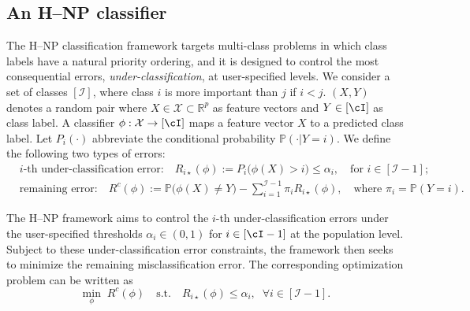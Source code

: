 \subsection{An H--NP classifier}
The H--NP classification framework targets multi-class problems in which class labels have a natural priority ordering, and it is designed to control the most consequential errors, \emph{under-classification}, at user-specified levels. We consider a set of classes $[\mathcal{I}]$, where class $i$ is more important than $j$ if $i < j$. $(X, Y)$ denotes a random pair where $X \in \mathcal{X}\subset \mathbb{R}^p$ as feature vectors and $Y \in [\cI]$ as class label. A classifier $\phi: \mathcal{X}  \rightarrow [\cI]$ maps a feature vector $X$ to a predicted class label. Let  $P_i(\cdot)$ abbreviate the conditional probability $\mathbb{P}(\cdot|Y=i)$.  We define the following two types of errors:
\begin{align}
&\text{$i$-th under-classification error:} \quad R_{i\star}(\phi):= P_i\bigl(\phi(X) > i\bigr)\le \alpha_i, \quad \text{for } i  \in [\mathcal{I}-1]; \label{eq:under-error}\\
&\text{remaining error:} \quad R^c(\phi) := \mathbb{P}\bigl(\phi(X)\neq Y\bigr) - \sum_{i=1}^{\mathcal{I}-1} \pi_i R_{i\star}(\phi), \quad \text{where } \pi_i = \mathbb{P}(Y=i). \label{eq:def_of_error}
\end{align}




The H--NP framework aims to control the $i$-th under-classification errors  under the user-specified thresholds $\alpha_i \in (0,1)$ for $i \in [\cI - 1]$ at the population level. Subject to these under-classification error constraints, the framework then seeks to minimize the remaining misclassification error. The corresponding optimization problem can be written as
\begin{equation}\label{eq:hnp_goal}
\min_{\phi} \; R^c(\phi)
\quad \text{s.t.} \quad
R_{i\star}(\phi) \le \alpha_i, \;\; \forall i \in [\mathcal{I}-1].
\end{equation}

